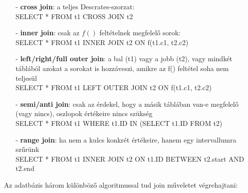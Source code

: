 \documentclass[12pt]{article}
\theoremstyle{plain}
\begin{document}
\begin{itemize}
    \item[-] \textbf{cross join}: a teljes Descrates-szorzat: \\
    SELECT * FROM t1 CROSS JOIN t2
    \item[-] \textbf{inner join}: csak az $f()$ feltételnek megfelelő sorok: \\ 
    SELECT * FROM t1 INNER JOIN t2 ON f(t1.c1, t2.c2) 
    \item[-] \textbf{left/right/full outer join}: a bal (t1) vagy a jobb (t2), vagy mindkét táblából azokat a sorokat is hozzáveszi, amikre az f() feltétel soha nem teljesül \\
    SELECT * FROM t1 LEFT OUTER JOIN t2 ON f(t1.c1, t2.c2)
    \item[-] \textbf{semi/anti join}: csak az érdekel, hogy a másik táblában van-e megfelelő (vagy nincs), oszlopok értékeire nincs szükség \\
    SELECT * FROM t1 WHERE t1.ID IN (SELECT t1.ID FROM t2)
    \item[-] \textbf{range join}: ha nem a kulcs konkrét értékeire, hanem egy intervallumra szűrünk \\
    SELECT * FROM t1 INNER JOIN t2 ON t1.ID BETWEEN t2.start AND t2.end
\end{itemize}{}
\bigskip
Az adatbázis három különböző algoritmussal tud join műveletet végrehajtani:
\end{document}

